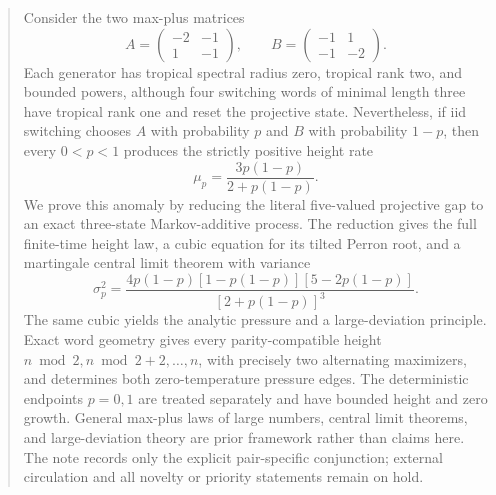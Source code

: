 \begin{abstract}
Consider the two max-plus matrices
\[
 A=\begin{pmatrix}-2&-1\\1&-1\end{pmatrix},\qquad
 B=\begin{pmatrix}-1&1\\-1&-2\end{pmatrix}.
\]
Each generator has tropical spectral radius zero, tropical rank two, and
bounded powers, although four switching words of minimal length three have
tropical rank one and reset the projective state.  Nevertheless, if iid
switching chooses $A$ with probability $p$ and $B$ with probability $1-p$,
then every $0<p<1$ produces the strictly positive height rate
\[
 \mu_p=\frac{3p(1-p)}{2+p(1-p)}.
\]
We prove this anomaly by reducing the literal five-valued projective gap to
an exact three-state Markov-additive process.  The reduction gives the full
finite-time height law, a cubic equation for its tilted Perron root, and a
martingale central limit theorem with variance
\[
 \sigma_p^2=
 \frac{4p(1-p)[1-p(1-p)][5-2p(1-p)]}{[2+p(1-p)]^3}.
\]
The same cubic yields the analytic pressure and a large-deviation principle.
Exact word geometry gives every parity-compatible height
$n\bmod2,n\bmod2+2,\ldots,n$, with precisely two alternating maximizers,
and determines both zero-temperature pressure edges.
The deterministic endpoints $p=0,1$ are treated separately and have bounded
height and zero growth.  General max-plus laws of large numbers, central
limit theorems, and large-deviation theory are prior framework rather than
claims here.  The note records only the explicit pair-specific conjunction;
external circulation and all novelty or priority statements remain on hold.
\end{abstract}

